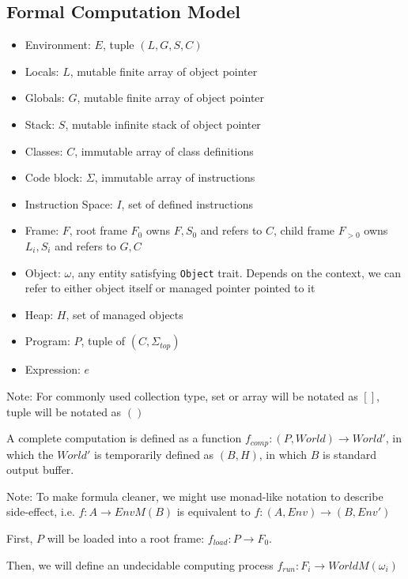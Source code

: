\documentclass[]{article}
\numberwithin{equation}{section}
\numberwithin{figure}{section}
\numberwithin{table}{section}
\begin{document}
\subsection{Formal Computation Model}\label{formal-computation-model}

\begin{itemize}
\itemsep1pt\parskip0pt
\item
  Environment: $E$, tuple $(L, G, S, C)$
\item
  Locals: $L$, mutable finite array of object pointer
\item
  Globals: $G$, mutable finite array of object pointer
\item
  Stack: $S$, mutable infinite stack of object pointer
\item
  Classes: $C$, immutable array of class definitions
\item
  Code block: $\Sigma$, immutable array of instructions
\item
  Instruction Space: $I$, set of defined instructions
\item
  Frame: $F$, root frame $F_0$ owns $F, S_0$ and refers to $C$, child frame $F_{>0}$ owns $L_i, S_i$ and refers to $G, C$
\item
  Object: $\omega$, any entity satisfying \texttt{Object} trait. Depends on the context, we can refer to either object itself or managed pointer pointed to it
\item
  Heap: $H$, set of managed objects
\item
  Program: $P$, tuple of $(C, \Sigma_{top})$
\item
  Expression: $e$
\end{itemize}

Note: For commonly used collection type, set or array will be notated as $[]$, tuple will be notated as $()$

A complete computation is defined as a function
$f_{comp}: (P, World) \rightarrow World'$, in which the $World'$ is
temporarily defined as $(B, H)$, in which $B$ is standard output buffer.

Note: To make formula cleaner, we might use monad-like notation to
describe side-effect, i.e. $f: A \rightarrow EnvM(B)$ is equivalent to
$f: (A, Env) \rightarrow (B, Env')$

First, $P$ will be loaded into a root frame:
$f_{load}: P \rightarrow F_0$.

Then, we will define an undecidable computing process
$f_{run}: F_i \rightarrow WorldM(\omega_{i})$
\end{document}
